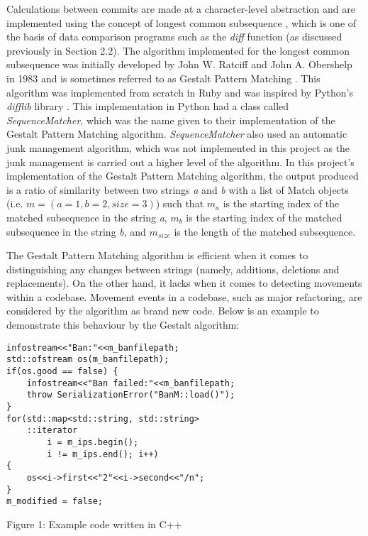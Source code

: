 Calculations between commits are made at a character-level abstraction and are implemented using the concept of longest common subsequence \citep{wiki:lcs}, which is one of the basis of data comparison programs such as the \textit{diff} function (as discussed previously in Section 2.2). The algorithm implemented for the longest common subsequence was initially developed by John W. Ratciff and John A. Obershelp in 1983 and is sometimes referred to as Gestalt Pattern Matching \citep{wiki:gpm}. This algorithm was implemented from scratch in Ruby and was inspired by Python's \textit{difflib} library \citep{python_software_foundation_2021}. This implementation in Python had a class called \textit{SequenceMatcher}, which was the name given to their implementation of the Gestalt Pattern Matching algorithm. \textit{SequenceMatcher} also used an automatic junk management algorithm, which was not implemented in this project as the junk management is carried out a higher level of the algorithm. In this project's implementation of the Gestalt Pattern Matching algorithm, the output produced is a ratio of similarity between two strings \textit{a} and \textit{b} with a list of Match objects (i.e. $m = (a = 1, b = 2, size = 3)$) such that \textit{$m_a$} is the starting index of the matched subsequence in the string \textit{a}, \textit{$m_b$} is the starting index of the matched subsequence in the string \textit{b}, and \textit{$m_{size}$} is the length of the matched subsequence.

The Gestalt Pattern Matching algorithm is efficient when it comes to distinguishing any changes between strings (namely, additions, deletions and replacements). On the other hand, it lacks when it comes to detecting movements within a codebase. Movement events in a codebase, such as major refactoring, are considered by the algorithm as brand new code. Below is an example to demonstrate this behaviour by the Gestalt algorithm:
\begin{verbatim}
infostream<<"Ban:"<<m_banfilepath;
std::ofstream os(m_banfilepath);
if(os.good == false) {
    infostream<<"Ban failed:"<<m_banfilepath;
    throw SerializationError("BanM::load()");
}
for(std::map<std::string, std::string>
    ::iterator
        i = m_ips.begin();
        i != m_ips.end(); i++)
{
    os<<i->first<<"2"<<i->second<<"/n";
}
m_modified = false;
\end{verbatim}
\begin{center}
    \caption{Figure 1: Example code written in C++ \citep{ahola_2018}}
\end{center}


